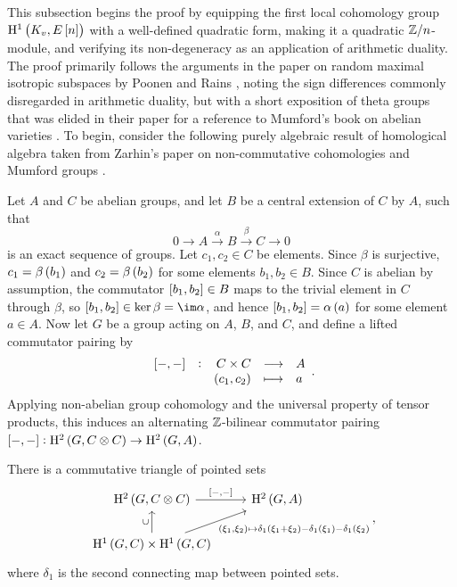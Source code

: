 This subsection begins the proof by equipping the first local cohomology group $ \HE[n]{K_v} $ with a well-defined quadratic form, making it a quadratic $ \mathbb{Z} / n $-module, and verifying its non-degeneracy as an application of arithmetic duality. The proof primarily follows the arguments in the paper on random maximal isotropic subspaces by Poonen and Rains \cite{PR12}, noting the sign differences commonly disregarded in arithmetic duality, but with a short exposition of theta groups that was elided in their paper for a reference to Mumford's book on abelian varieties \cite{Mum70}. To begin, consider the following purely algebraic result of homological algebra taken from Zarhin's paper on non-commutative cohomologies and Mumford groups \cite{Zar74}.

\pagebreak

Let $ A $ and $ C $ be abelian groups, and let $ B $ be a central extension of $ C $ by $ A $, such that
$$ 0 \to A \xrightarrow{\alpha} B \xrightarrow{\beta} C \to 0 $$
is an exact sequence of groups. Let $ c_1, c_2 \in C $ be elements. Since $ \beta $ is surjective, $ c_1 = \beta\br{b_1} $ and $ c_2 = \beta\br{b_2} $ for some elements $ b_1, b_2 \in B $. Since $ C $ is abelian by assumption, the commutator $ \sbr{b_1, b_2} \in B $ maps to the trivial element in $ C $ through $ \beta $, so $ \sbr{b_1, b_2} \in \ker \beta = \im \alpha $, and hence $ \sbr{b_1, b_2} = \alpha\br{a} $ for some element $ a \in A $. Now let $ G $ be a group acting on $ A $, $ B $, and $ C $, and define a lifted commutator pairing by
$$ \function[\sbr{-, -}]{C \times C}{A}{\br{c_1, c_2}}{a}. $$
Applying non-abelian group cohomology and the universal property of tensor products, this induces an alternating $ \mathbb{Z} $-bilinear commutator pairing $ \sbr{-, -} : \H^2\br{G, C \otimes C} \to \H^2\br{G, A} $.

\begin{lemma}
\label{lem:cupcommutator}
There is a commutative triangle of pointed sets
$$
\begin{tikzcd}
\H^2\br{G, C \otimes C} \arrow{r}{\sbr{-, -}} & \H^2\br{G, A} \\
\H^1\br{G, C} \times \H^1\br{G, C} \arrow{u}{\cup} \arrow{ur}[swap]{\br{\xi_1, \xi_2} \mapsto \delta_1\br{\xi_1 + \xi_2} - \delta_1\br{\xi_1} - \delta_1\br{\xi_2}} &
\end{tikzcd},
$$
where $ \delta_1 $ is the second connecting map between pointed sets.
\end{lemma}

